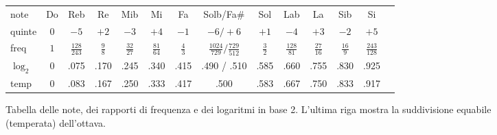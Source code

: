 \begin{figure}
    \begin{center}
        \setlength{\tabcolsep}{1mm}%
        \begin{tabular}{@{}l|ccccccccccccc@{}}
            note   &   Do   &   Reb           &   Re     &    Mib        &   Mi          &    Fa    &  Solb/Fa\#                       &   Sol    &  Lab           &   La          &   Sib         &   Si            \\
            quinte &   $0$  &  $-5$           &  $+2$    &    $-3$       &  $+4$         &   $-1$   &  $-6/+6$                         &  $+1$    &  $-4$          &  $+3$         &  $-2$         &  $+5$           \\
            freq   &   $1$  &$\frac{128}{243}$&$\frac 98$&$\frac{32}{27}$&$\frac{81}{64}$&$\frac 43$&$\frac{1024}{729}/\frac{729}{512}$&$\frac 32$&$\frac{128}{81}$&$\frac{27}{16}$&$\frac{16}9$   &$\frac{243}{128}$\\
        $\log_2$   &\small 0&\small .075 &\small  .170& \small  .245& \small  .340 & \small  .415& \small  .490 / .510         &\small  .585&\small  .660&\small  .755  &\small  .830  &\small  .925    \\
              temp &\small 0&\small .083 &\small  .167& \small  .250& \small  .333 & \small  .417& \small  .500                &\small  .583&\small  .667&\small  .750  &\small  .833  &\small  .917    \\
        \end{tabular}
    \end{center}
    \caption{Tabella delle note, dei rapporti di frequenza e dei logaritmi in base 2. 
    L’ultima riga mostra la suddivisione equabile (temperata) dell’ottava.}
\end{figure}
    

